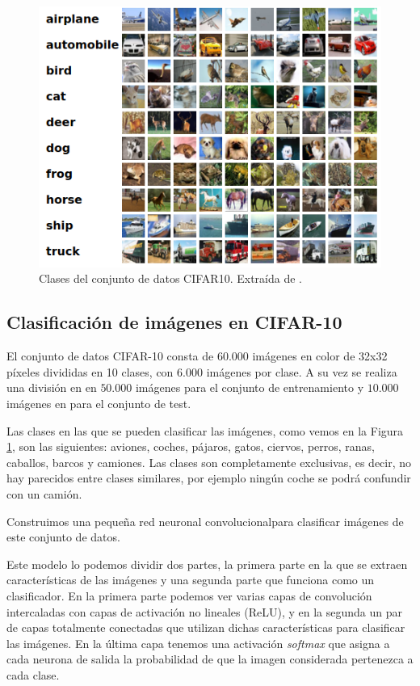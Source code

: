 \documentclass[
  a4paper,
  12pt,
  spanish,
]{scrartcl}
\theoremstyle{teorema-style}
\begin{document}
\begin{figure}[h]
  \centering
  \includegraphics[width=.7\textwidth]{img/cifar10}
  \caption{Clases del conjunto de datos CIFAR10. Extraída de \parencite{rizhevsky_cifar_2013}.}
  \label{fig:cifar10}
\end{figure}

\subsection{Clasificación de imágenes en CIFAR-10}

El conjunto de datos CIFAR-10 \parencite{rizhevsky_learning_2009} consta de $60.000$ imágenes en color de 32x32 píxeles divididas en 10 clases, con $6.000$ imágenes por clase. A su vez se realiza una división en en $50.000$ imágenes para el conjunto de entrenamiento y $10.000$ imágenes en para el conjunto de test.

Las clases en las que se pueden clasificar las imágenes, como vemos en la Figura \ref{fig:cifar10}, son las siguientes: aviones, coches, pájaros, gatos, ciervos, perros, ranas, caballos, barcos y camiones. Las clases son completamente exclusivas, es decir, no hay parecidos entre clases similares, por ejemplo ningún coche se podrá confundir con un camión.

Construimos una pequeña red neuronal convolucional\footnotemark para clasificar imágenes de este conjunto de datos.

Este modelo lo podemos dividir dos partes, la primera parte en la que se extraen características de las imágenes y una segunda parte que funciona como un clasificador. En la primera parte podemos ver varias capas de convolución intercaladas con capas de activación no lineales (ReLU), y en la segunda un par de capas totalmente conectadas que utilizan dichas características para clasificar las imágenes. En la última capa tenemos una activación \textit{softmax} que asigna a cada neurona de salida la probabilidad de que la imagen considerada pertenezca a cada clase.
\end{document}

